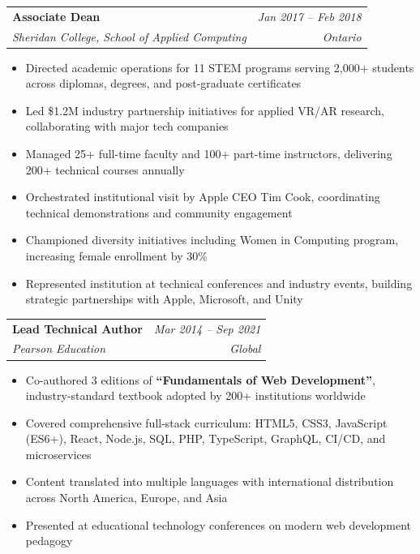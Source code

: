 \documentclass[11pt]{article}
\makeatletter
\newcommand{\tech}[1]{\textcolor{secondary}{\textbf{#1}}}
\newcommand{\experience}[4]{
  \vspace{4pt}
  \begin{tabular*}{\textwidth}{@{}l@{\extracolsep{\fill}}r@{}}
    \textbf{#1} & \textit{#2} \\
    \textit{\small#3} & \textit{\small#4}
  \end{tabular*}
  \vspace{-4pt}
}
\makeatother
\begin{document}
\experience{Associate Dean}{Jan 2017 -- Feb 2018}{Sheridan College, School of Applied Computing}{Ontario}
\begin{itemize}
    \item Directed academic operations for 11 STEM programs serving 2,000+ students across diplomas, degrees, and post-graduate certificates
    \item Led \$1.2M industry partnership initiatives for applied VR/AR research, collaborating with major tech companies
    \item Managed 25+ full-time faculty and 100+ part-time instructors, delivering 200+ technical courses annually
    \item Orchestrated institutional visit by Apple CEO Tim Cook, coordinating technical demonstrations and community engagement
    \item Championed diversity initiatives including Women in Computing program, increasing female enrollment by 30\%
    \item Represented institution at technical conferences and industry events, building strategic partnerships with Apple, Microsoft, and Unity
\end{itemize}

\experience{Lead Technical Author}{Mar 2014 -- Sep 2021}{Pearson Education}{Global}
\begin{itemize}
    \item Co-authored 3 editions of \tech{``Fundamentals of Web Development''}, industry-standard textbook adopted by 200+ institutions worldwide
    \item Covered comprehensive full-stack curriculum: HTML5, CSS3, JavaScript (ES6+), React, Node.js, SQL, PHP, TypeScript, GraphQL, CI/CD, and microservices
    \item Content translated into multiple languages with international distribution across North America, Europe, and Asia
    \item Presented at educational technology conferences on modern web development pedagogy
\end{itemize}
\end{document}
